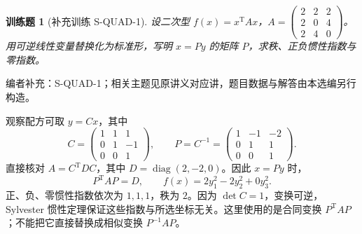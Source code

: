 \documentclass[UTF8,12pt,a4paper,fontset=fandol]{ctexart}
\newtheorem{exercise}{训练题}[section]
\begin{document}
\begin{exercise}[补充训练 S-QUAD-1]\label{prob:S-QUAD-1}
设二次型 $f(x)=x^{\mathrm T}Ax$，$A=\begin{pmatrix}2&2&2\\2&0&4\\2&4&0\end{pmatrix}$。用可逆线性变量替换化为标准形，写明 $x=Py$ 的矩阵 $P$，求秩、正负惯性指数与零指数。
\end{exercise}
\noindent 编者补充：S-QUAD-1；相关主题见原讲义对应讲，题目数据与解答由本选编另行构造。
\begin{solve}
观察配方可取 $y=Cx$，其中
\[C=\begin{pmatrix}1&1&1\\0&1&-1\\0&0&1\end{pmatrix},\qquad P=C^{-1}=\begin{pmatrix}1&-1&-2\\0&1&1\\0&0&1\end{pmatrix}.\]
直接核对 $A=C^{\mathrm T}DC$，其中 $D=\operatorname{diag}(2,-2,0)$。因此 $x=Py$ 时，
\[P^{\mathrm T}AP=D,\qquad f(x)=2y_1^2-2y_2^2+0y_3^2.\]
正、负、零惯性指数依次为 $1,1,1$，秩为 $2$。因为 $\det C=1$，变换可逆，Sylvester 惯性定理保证这些指数与所选坐标无关。这里使用的是合同变换 $P^{\mathrm T}AP$；不能把它直接替换成相似变换 $P^{-1}AP$。
\end{solve}
\end{document}
